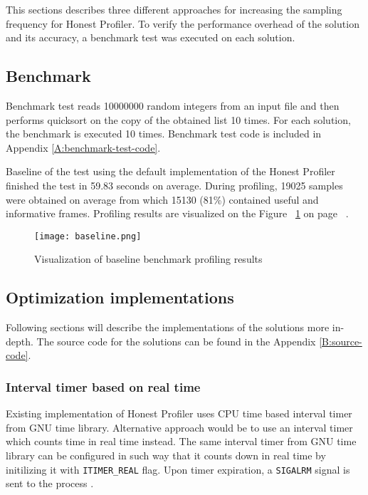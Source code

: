 \documentclass[..thesis.tex]{subfiles}
\begin{document}
This sections describes three different approaches for increasing the sampling frequency for Honest Profiler. To verify the performance overhead of the solution and its accuracy, a benchmark test was executed on each solution.

\subsection{Benchmark}
Benchmark test reads 10000000 random integers from an input file and then performs quicksort on the copy of the obtained list 10 times. For each solution, the benchmark is executed 10 times. Benchmark test code is included in Appendix \ref{A:benchmark-test-code}. 

Baseline of the test using the default implementation of the Honest Profiler finished the test in 59.83 seconds on average. During profiling, 19025 samples were obtained on average from which 15130 (81\%) contained useful and informative frames. Profiling results are visualized on the Figure ~\ref{fig:baseline} on page ~\pageref{fig:baseline}. 

\begin{figure}[H]
\texttt{[image: baseline.png]}
\caption{Visualization of baseline benchmark profiling results}
\label{fig:baseline}
\end{figure}

\subsection{Optimization implementations}
Following sections will describe the implementations of the solutions more in-depth. The source code for the solutions can be found in the Appendix \ref{B:source-code}.

\subsubsection{Interval timer based on real time}
Existing implementation of Honest Profiler uses CPU time based interval timer from GNU time library. Alternative approach would be to use an interval timer which counts time in real time instead. The same interval timer from GNU time library can be configured in such way that it counts down in real time by initilizing it with \texttt{ITIMER\_REAL} flag. Upon timer expiration, a \texttt{SIGALRM} signal is sent to the process \cite{getitimer2}.
\end{document}
